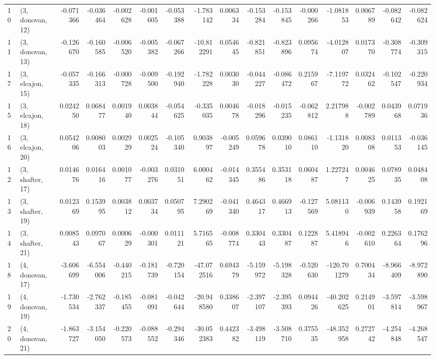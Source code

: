\begin{tabular}{llrrrrrrrrrrrrrr}
10 &  (3, donovan, 12) & -0.071366 & -0.036464 &  -0.002628 & -0.001605 & -0.053388 &  -1.783142 &  0.006334 &  -0.153284 & -0.153845 & -0.000266 &   -1.081853 &  0.006789 & -0.082642 & -0.082624 \\
11 &  (3, donovan, 13) & -0.126670 & -0.160585 &  -0.006520 & -0.005382 & -0.067266 & -10.812291 &  0.054645 &  -0.821851 & -0.823896 &  0.095674 &   -4.012807 &  0.017370 & -0.308774 & -0.309315 \\
17 &  (3, elcajon, 15) & -0.057335 & -0.166313 &  -0.000728 & -0.009500 & -0.192940 &  -1.782228 &  0.003030 &  -0.044227 & -0.086472 &  0.215967 &   -7.119772 &  0.032462 & -0.102547 & -0.220934 \\
15 &  (3, elcajon, 18) &  0.024250 &  0.068477 &   0.001940 &  0.003844 & -0.054625 &  -0.335035 &  0.004678 &  -0.018296 & -0.015235 & -0.062812 &    2.217988 & -0.002789 &  0.043968 &  0.071936 \\
16 &  (3, elcajon, 20) &  0.054206 &  0.008003 &   0.002929 &  0.002524 & -0.105340 &   0.903897 & -0.005249 &   0.059678 &  0.039010 &  0.086110 &   -1.131820 &  0.008308 &  0.011353 & -0.036145 \\
12 &  (3, shafter, 17) &  0.014676 &  0.016416 &   0.001077 & -0.003276 &  0.031051 &   6.000462 & -0.014345 &   0.355486 &  0.353118 &  0.060487 &    1.227247 &  0.004625 &  0.078935 &  0.048408 \\
13 &  (3, shafter, 19) &  0.012369 &  0.153995 &   0.003812 &  0.003734 &  0.050795 &   7.290269 & -0.041340 &   0.464317 &  0.466913 & -0.127569 &    5.081130 & -0.006939 &  0.143958 &  0.192169 \\
14 &  (3, shafter, 21) &  0.008543 &  0.097067 &   0.000629 & -0.000301 &  0.011121 &   5.716565 & -0.008774 &   0.330443 &  0.330487 &  0.122887 &    5.418946 & -0.002610 &  0.226364 &  0.176296 \\
18 &  (4, donovan, 17) & -3.606699 & -6.554006 &  -0.440215 & -0.181739 & -0.720154 & -47.072516 &  0.694379 &  -5.159972 & -5.198328 & -0.520630 & -120.701279 &  0.700434 & -8.966409 & -8.972890 \\
19 &  (4, donovan, 19) & -1.730534 & -2.762337 &  -0.185455 & -0.081091 & -0.042644 & -20.948580 &  0.338607 &  -2.397107 & -2.395393 &  0.094426 &  -40.202625 &  0.214901 & -3.597814 & -3.598967 \\
20 &  (4, donovan, 21) & -1.863727 & -3.154050 &  -0.220573 & -0.088552 & -0.294346 & -30.052383 &  0.442382 &  -3.498119 & -3.508710 &  0.375535 &  -48.352958 &  0.272742 & -4.254848 & -4.268547 \\

\end{tabular}
